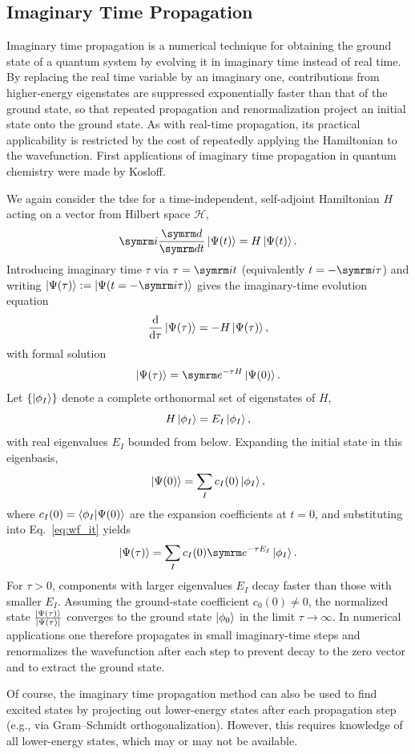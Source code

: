 \subsection{Imaginary Time Propagation}\label{sec:imaginary_time_propagation}
Imaginary time propagation is a numerical technique for obtaining the ground state of a quantum system by evolving it in imaginary time instead of real time. By replacing the real time variable by an imaginary one, contributions from higher-energy eigenstates are suppressed exponentially faster than that of the ground state, so that repeated propagation and renormalization project an initial state onto the ground state. As with real-time propagation, its practical applicability is restricted by the cost of repeatedly applying the Hamiltonian to the wavefunction. First applications of imaginary time propagation in quantum chemistry were made by Kosloff.\supercite{10.1021/j100319a003}

We again consider the \gls{tdse} for a time-independent, self-adjoint Hamiltonian
$H$ acting on a vector from Hilbert space $\mathcal{H}$,
\begin{equation}\label{eq:tdse_it_real}
\i\ddt\ket{\Psi(t)}=H\ket{\Psi(t)}.
\end{equation}
Introducing imaginary time $\tau$ via $\tau=\i t$ (equivalently $t=-\i\tau$) and writing
$\ket{\Psi(\tau)}:=\ket{\Psi(t=-\i\tau)}$ gives the imaginary-time evolution equation
\begin{equation}\label{eq:tdse_it}
\frac{\mathrm{d}}{\mathrm{d}\tau}\ket{\Psi(\tau)}=-H\ket{\Psi(\tau)},
\end{equation}
with formal solution
\begin{equation}\label{eq:wf_it}
\ket{\Psi(\tau)}=\e^{-\tau H}\ket{\Psi(0)}.
\end{equation}
Let $\{\ket{\phi_I}\}$ denote a complete orthonormal set of eigenstates of $H$,
\begin{equation}
H\ket{\phi_I}=E_I\ket{\phi_I},
\end{equation}
with real eigenvalues $E_I$ bounded from below. Expanding the initial state in this eigenbasis,
\begin{equation}\label{eq:wf_expansion_eigenstates}
\ket{\Psi(0)}=\sum_I c_I(0)\ket{\phi_I},
\end{equation}
where $c_I(0)=\braket{\phi_I\vert\Psi(0)}$ are the expansion coefficients at $t=0$, and substituting into Eq.~\eqref{eq:wf_it} yields
\begin{equation}\label{eq:tdse_it_expansion}
\ket{\Psi(\tau)}=\sum_I c_I(0)\e^{-\tau E_I}\ket{\phi_I}.
\end{equation}
For $\tau>0$, components with larger eigenvalues $E_I$ decay faster than those with smaller $E_I$. Assuming the ground-state coefficient $c_0(0)\neq 0$, the normalized state $\frac{\ket{\Psi(\tau)}}{\lvert\Psi(\tau)\rvert}$ converges to the ground state $\ket{\phi_0}$ in the limit $\tau\to\infty$. In numerical applications one therefore propagates in small imaginary-time steps and renormalizes the wavefunction after each step to prevent decay to the zero vector and to extract the ground state.

Of course, the imaginary time propagation method can also be used to find excited states by projecting out lower-energy states after each propagation step (e.g., via Gram--Schmidt orthogonalization). However, this requires knowledge of all lower-energy states, which may or may not be available.
